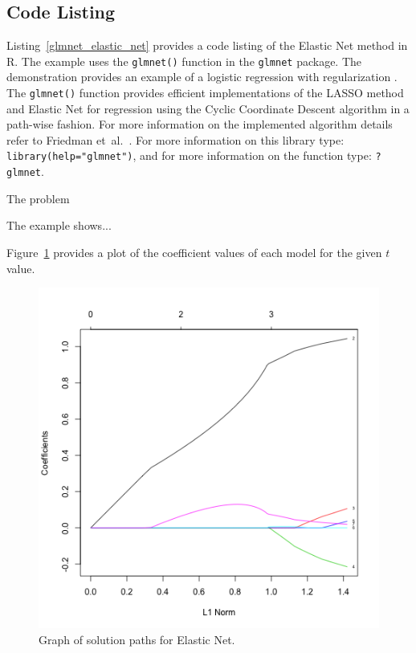 \subsection{Code Listing}
Listing~\ref{glmnet_elastic_net} provides a code listing of the Elastic Net method in R.
The example uses the \texttt{glmnet()} function in the \texttt{glmnet} package. The demonstration provides an example of a logistic regression with regularization \cite{Friedman2011}. The \texttt{glmnet()} function provides efficient implementations of the LASSO method and Elastic Net for regression using the Cyclic Coordinate Descent algorithm in a path-wise fashion. For more information on the implemented algorithm details refer to Friedman et~al.\ \cite{Friedman2010}. For more information on this library type: \texttt{library(help="glmnet")}, and for more information on the function type: \texttt{?glmnet}.

The problem

The example shows...

Figure~\ref{plot:elastic_net_result} provides a plot of the coefficient values of each model for the given $t$ value.



\begin{figure}[htp]
\centering
\includegraphics[scale=0.60]{a_regularization/elastic_net_result.png}
\caption{Graph of solution paths for Elastic Net.}
\label{plot:elastic_net_result}
\end{figure}

